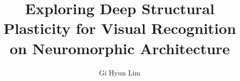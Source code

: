 \documentclass[preprint,12pt]{elsarticle}
\begin{document}
\begin{frontmatter}



\title{Exploring Deep Structural Plasticity for Visual Recognition on Neuromorphic Architecture}




\author{Gi Hyun Lim} %



\end{frontmatter}
\end{document}
